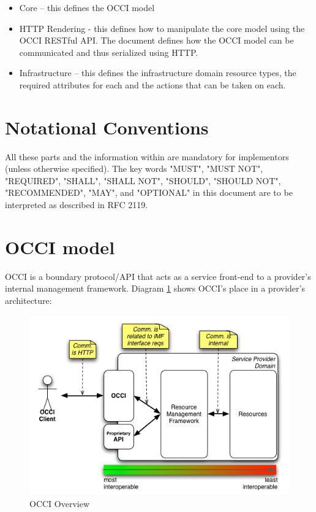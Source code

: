 \documentclass[10pt,a4paper]{article}
\begin{document}
\begin{itemize}
\item Core – this defines the OCCI model
\item HTTP Rendering - this defines how to manipulate the core model using the OCCI RESTful API. The document defines how the OCCI model can be communicated and thus serialized using HTTP.
\item Infrastructure – this defines the infrastructure domain resource types, the required attributes for each and the actions that can be taken on each.
\end{itemize}

\section{Notational Conventions}
All these parts and the information within are mandatory for implementors (unless otherwise specified). The key words "MUST", "MUST NOT", "REQUIRED", "SHALL", "SHALL NOT", "SHOULD", "SHOULD NOT", "RECOMMENDED", "MAY", and "OPTIONAL" in this document are to be interpreted as described in RFC 2119. 

\section{OCCI model}
OCCI is a boundary protocol/API that acts as a service front-end to a provider’s internal management framework. Diagram \ref{fig:placement} shows OCCI's place in a provider’s architecture:

\begin{figure}[!hp]
	\centering
	\includegraphics[scale=0.5]{figs/occi-intro.png}
	\caption{OCCI Overview}
	\label{fig:placement}
\end{figure}
\end{document}
